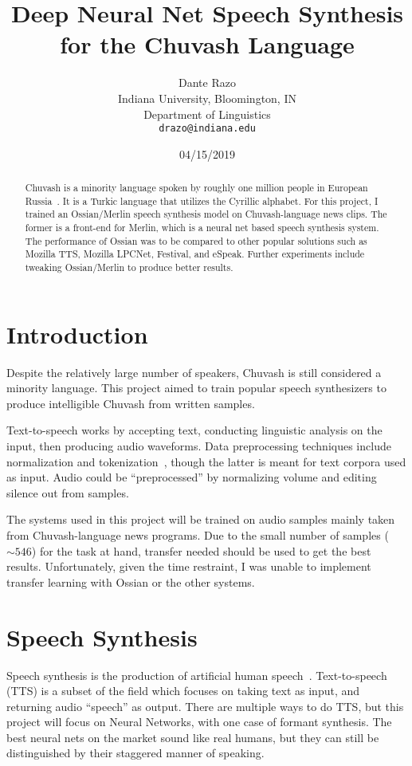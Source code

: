\documentclass[11pt,a4paper]{article}
\title{Deep Neural Net Speech Synthesis for the Chuvash Language}
\author{Dante Razo \\
  Indiana University, Bloomington, IN \\
  Department of Linguistics \\
  {\tt drazo@indiana.edu} \\}
\date{04/15/2019}
\begin{document}
\maketitle
\begin{abstract}
  Chuvash is a minority language spoken by roughly one million people in European Russia~\cite{RBS:12}. It is a Turkic language that utilizes the Cyrillic alphabet. For this project, I trained an Ossian/Merlin speech synthesis model on Chuvash-language news clips. The former is a front-end for Merlin, which is a neural net based speech synthesis system. The performance of Ossian was to be compared to other popular solutions such as Mozilla TTS, Mozilla LPCNet, Festival, and eSpeak. Further experiments include tweaking Ossian/Merlin to produce better results.
\end{abstract}

\section{Introduction}\label{sect:intro}
Despite the relatively large number of speakers, Chuvash is still considered a minority language. This project aimed to train popular speech synthesizers to produce intelligible Chuvash from written samples.

Text-to-speech works by accepting text, conducting linguistic analysis on the input, then producing audio waveforms. Data preprocessing techniques include normalization and tokenization~\cite{wiki-lexanalysis}, though the latter is meant for text corpora used as input. Audio could be ``preprocessed'' by normalizing volume and editing silence out from samples.

The systems used in this project will be trained on audio samples mainly taken from Chuvash-language news programs. Due to the small number of samples ($\sim546$) for the task at hand, transfer needed should be used to get the best results. Unfortunately, given the time restraint, I was unable to implement transfer learning with Ossian or the other systems.

\section{Speech Synthesis}\label{sect:speech}
Speech synthesis is the production of artificial human speech~\cite{wiki-speechsynthesis}. Text-to-speech (TTS) is a subset of the field which focuses on taking text as input, and returning audio ``speech'' as output. There are multiple ways to do TTS, but this project will focus on Neural Networks, with one case of formant synthesis. The best neural nets on the market sound like real humans, but they can still be distinguished by their staggered manner of speaking.
\end{document}

